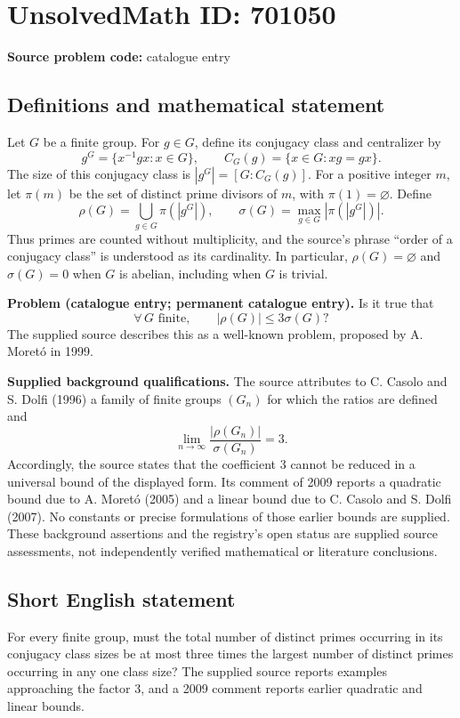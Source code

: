 \documentclass[11pt]{article}
\begin{document}
\section*{UnsolvedMath ID: 701050}
\textbf{Source problem code:} catalogue entry
\subsection{Definitions and mathematical statement}
Let \(G\) be a finite group. For \(g\in G\), define its conjugacy class and centralizer by
\[
g^G=\{x^{-1}gx:x\in G\},\qquad C_G(g)=\{x\in G:xg=gx\}.
\]
The size of this conjugacy class is \(|g^G|=[G:C_G(g)]\). For a positive integer \(m\), let \(\pi(m)\) be the set of distinct prime divisors of \(m\), with \(\pi(1)=\varnothing\). Define
\[
\rho(G)=\bigcup_{g\in G}\pi(|g^G|),\qquad
\sigma(G)=\max_{g\in G}|\pi(|g^G|)|.
\]
Thus primes are counted without multiplicity, and the source's phrase ``order of a conjugacy class'' is understood as its cardinality. In particular, \(\rho(G)=\varnothing\) and \(\sigma(G)=0\) when \(G\) is abelian, including when \(G\) is trivial.

\textbf{Problem (catalogue entry; permanent catalogue entry).} Is it true that
\[
\forall\,G\text{ finite},\qquad |\rho(G)|\leq 3\sigma(G)?
\]
The supplied source describes this as a well-known problem, proposed by A. Moret\'{o} in 1999.

\textbf{Supplied background qualifications.} The source attributes to C. Casolo and S. Dolfi (1996) a family of finite groups \((G_n)\) for which the ratios are defined and
\[
\lim_{n\to\infty}\frac{|\rho(G_n)|}{\sigma(G_n)}=3.
\]
Accordingly, the source states that the coefficient \(3\) cannot be reduced in a universal bound of the displayed form. Its comment of 2009 reports a quadratic bound due to A. Moret\'{o} (2005) and a linear bound due to C. Casolo and S. Dolfi (2007). No constants or precise formulations of those earlier bounds are supplied. These background assertions and the registry's open status are supplied source assessments, not independently verified mathematical or literature conclusions.
\subsection{Short English statement}
For every finite group, must the total number of distinct primes occurring in its conjugacy class sizes be at most three times the largest number of distinct primes occurring in any one class size? The supplied source reports examples approaching the factor \(3\), and a 2009 comment reports earlier quadratic and linear bounds.
\end{document}
